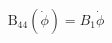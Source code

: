 \begin{equation} \label{eq:b44_linear_equation}
\operatorname{B_{44}}\left(\dot{\phi}\right) = B_{1} \dot{\phi}
\end{equation}
